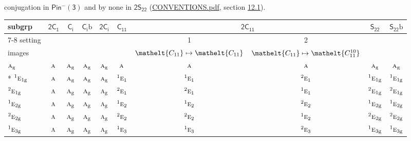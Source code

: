 \documentclass[10pt,a4paper]{article}
\numberwithin{equation}{section}
\newcommand{\eltfont}[1]{{\let\sigma\eltsigma\mathelt{#1}}}
\newcommand{\grp}[1]{\mathsf{#1}}
\newcommand{\irr}[1]{\text{\normalfont\scshape #1}}
\newcommand{\conjpair}[1]{{}^{#1}}
\newcommand{\cls}[1]{\eltfont{#1}}
\newcommand{\ptag}[1]{\mathrm{#1}}
\newcommand{\secondclass}{\mathrm{b}}
\begin{document}
conjugation in \href{Pinminus3.pdf}{$\grp{Pin^{-}(3)}$} and by none in $\grp{2S_{22}}$ (\href{../../CONVENTIONS.pdf}{CONVENTIONS.pdf}, section \href{../../../rotation/CONVENTIONS.pdf\#conv.12.1}{12.1}).
{\small\begin{longtable}{@{}lccccccccc@{}}\toprule
subgrp & \href{2C1.pdf}{$\grp{2C_{1}}$} & \href{S2.pdf}{$\grp{C_{i}}$} & \href{S2b.pdf}{$\grp{C_{i}}\secondclass$} & \href{2S2.pdf}{$\grp{2C_{i}}$} & \href{C11.pdf}{$\grp{C_{11}}$} & \multicolumn{2}{c}{\href{2C11.pdf}{$\grp{2C_{11}}$}} & \href{S22.pdf}{$\grp{S_{22}}$} & \href{S22b.pdf}{$\grp{S_{22}}\secondclass$}\\\cmidrule(lr){7-8}
setting &  &  &  &  &  & 1 & 2 &  & \\
images &  &  &  &  &  & {\scriptsize $\cls{C_{11}} \mapsto \cls{C_{11}}$} & {\scriptsize $\cls{C_{11}} \mapsto \cls{C_{11}^{10}}$} &  & \\\midrule\endhead
\bottomrule\endfoot\endlastfoot
$\irr{a}_{\ptag{g}}$ & $\irr{a}$ & $\irr{a}_{\ptag{g}}$ & $\irr{a}_{\ptag{g}}$ & $\irr{a}_{\ptag{g}}$ & $\irr{a}$ & $\irr{a}$ & $\irr{a}$ & $\irr{a}_{\ptag{g}}$ & $\irr{a}_{\ptag{g}}$\\*
$\conjpair{1}\irr{e}_{1\ptag{g}}$ & $\irr{a}$ & $\irr{a}_{\ptag{g}}$ & $\irr{a}_{\ptag{g}}$ & $\irr{a}_{\ptag{g}}$ & $\conjpair{1}\irr{e}_{1}$ & $\conjpair{1}\irr{e}_{1}$ & $\conjpair{2}\irr{e}_{1}$ & $\conjpair{1}\irr{e}_{1\ptag{g}}$ & $\conjpair{1}\irr{e}_{1\ptag{g}}$\\
$\conjpair{2}\irr{e}_{1\ptag{g}}$ & $\irr{a}$ & $\irr{a}_{\ptag{g}}$ & $\irr{a}_{\ptag{g}}$ & $\irr{a}_{\ptag{g}}$ & $\conjpair{2}\irr{e}_{1}$ & $\conjpair{2}\irr{e}_{1}$ & $\conjpair{1}\irr{e}_{1}$ & $\conjpair{2}\irr{e}_{1\ptag{g}}$ & $\conjpair{2}\irr{e}_{1\ptag{g}}$\\
$\conjpair{1}\irr{e}_{2\ptag{g}}$ & $\irr{a}$ & $\irr{a}_{\ptag{g}}$ & $\irr{a}_{\ptag{g}}$ & $\irr{a}_{\ptag{g}}$ & $\conjpair{1}\irr{e}_{2}$ & $\conjpair{1}\irr{e}_{2}$ & $\conjpair{2}\irr{e}_{2}$ & $\conjpair{1}\irr{e}_{2\ptag{g}}$ & $\conjpair{1}\irr{e}_{2\ptag{g}}$\\
$\conjpair{2}\irr{e}_{2\ptag{g}}$ & $\irr{a}$ & $\irr{a}_{\ptag{g}}$ & $\irr{a}_{\ptag{g}}$ & $\irr{a}_{\ptag{g}}$ & $\conjpair{2}\irr{e}_{2}$ & $\conjpair{2}\irr{e}_{2}$ & $\conjpair{1}\irr{e}_{2}$ & $\conjpair{2}\irr{e}_{2\ptag{g}}$ & $\conjpair{2}\irr{e}_{2\ptag{g}}$\\
$\conjpair{1}\irr{e}_{3\ptag{g}}$ & $\irr{a}$ & $\irr{a}_{\ptag{g}}$ & $\irr{a}_{\ptag{g}}$ & $\irr{a}_{\ptag{g}}$ & $\conjpair{1}\irr{e}_{3}$ & $\conjpair{1}\irr{e}_{3}$ & $\conjpair{2}\irr{e}_{3}$ & $\conjpair{1}\irr{e}_{3\ptag{g}}$ & $\conjpair{1}\irr{e}_{3\ptag{g}}$\\

\end{longtable}}
\end{document}
